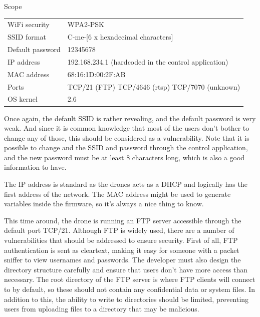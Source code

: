 \begin{chaptercover}{Scope}
\begingroup
\renewcommand*{\arraystretch}{1.3}
\begin{center}
\begin{tabular}{L{4cm}L{10cm}}
  WiFi security & WPA2-PSK \\
  SSID format & C-me-[6 x hexadecimal characters] \\
  Default password & 12345678 \\
  IP address & 192.168.234.1 (hardcoded in the control application) \\
  MAC address & 68:16:1D:00:2F:AB \\
  Ports & TCP/21 (FTP) \newline TCP/4646 (\acrshort{rtsp}) \newline TCP/7070 (unknown) \\
  OS kernel & 2.6 \\
\end{tabular}
\end{center}
\endgroup

Once again, the default SSID is rather revealing, and the default password is very weak. And since it is common knowledge that most of the users don’t bother to change any of those, this should be considered as a vulnerability. Note that it is possible to change and the SSID and password through the control application, and the new password must be at least 8 characters long, which is also a good information to have.

The IP address is standard as the drones acts as a DHCP and logically has the first address of the network. The MAC address might be used to generate variables inside the firmware, so it’s always a nice thing to know.

This time around, the drone is running an FTP server accessible through the default port TCP/21. Although FTP is widely used, there are a number of vulnerabilities that should be addressed to ensure security. First of all, FTP authentication is sent as cleartext, making it easy for someone with a packet sniffer to view usernames and passwords. The developer must also design the directory structure carefully and ensure that users don't have more access than necessary. The root directory of the FTP server is where FTP clients will connect to by default, so these should not contain any confidential data or system files. In addition to this, the ability to write to directories should be limited, preventing users from uploading files to a directory that may be malicious.


\end{chaptercover}
